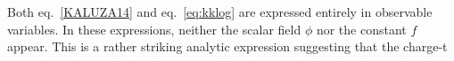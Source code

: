 Both eq.~\eqref{KALUZA14} and eq.~\eqref{eq:kklog} are expressed entirely in observable variables. In these expressions, neither the scalar field $\phi$ nor the constant $f$ appear. This is a rather striking analytic expression suggesting that the charge-t